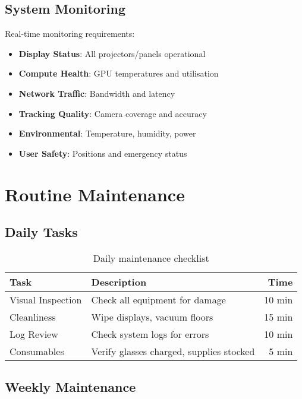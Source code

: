 \subsection{System Monitoring}

Real-time monitoring requirements:

\begin{itemize}
    \item \textbf{Display Status}: All projectors/panels operational
    \item \textbf{Compute Health}: GPU temperatures and utilisation
    \item \textbf{Network Traffic}: Bandwidth and latency
    \item \textbf{Tracking Quality}: Camera coverage and accuracy
    \item \textbf{Environmental}: Temperature, humidity, power
    \item \textbf{User Safety}: Positions and emergency status
\end{itemize}

\section{Routine Maintenance}

\subsection{Daily Tasks}


\begin{table}[H]
\centering
\begin{tabularx}{\textwidth}{@{}lXr@{}}
\toprule
\textbf{Task} & \textbf{Description} & \textbf{Time} \\
\midrule
Visual Inspection & Check all equipment for damage & 10 min \\
Cleanliness & Wipe displays, vacuum floors & 15 min \\
Log Review & Check system logs for errors & 10 min \\
Consumables & Verify glasses charged, supplies stocked & 5 min \\
\bottomrule
\end{tabularx}
\caption{Daily maintenance checklist}
\end{table}

\subsection{Weekly Maintenance}

